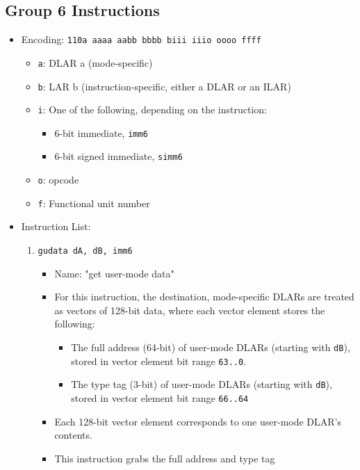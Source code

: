 \documentclass{article}
\begin{document}
	\subsection{Group 6 Instructions}
		\begin{itemize}
		\item Encoding:  \texttt{110a aaaa aabb bbbb  biii iiio oooo ffff}
			\begin{itemize}
			\item \texttt{a}:  DLAR a (mode-specific)
			\item \texttt{b}:  LAR b (instruction-specific, either a DLAR
				or an ILAR)
			\item \texttt{i}:
				One of the following, depending on the instruction:
				\begin{itemize}
				\item 6-bit immediate, \texttt{imm6}
				\item 6-bit signed immediate, \texttt{simm6}
				\end{itemize}
			\item \texttt{o}:  opcode
			\item \texttt{f}:  Functional unit number
			\end{itemize}
		\item Instruction List:
			\begin{enumerate}
			\item \texttt{gudata dA, dB, imm6}
				\begin{itemize}
				\item Name:  "get user-mode data"
				\item For this instruction, the destination, mode-specific
					DLARs are treated as vectors of 128-bit data, where
					each vector element stores the following:
					\begin{itemize}
					\item The full address (64-bit) of user-mode DLARs
						(starting with \texttt{dB}), stored in vector
						element bit range \texttt{63..0}.
					\item The type tag (3-bit) of user-mode DLARs (starting
						with \texttt{dB}), stored in vector element bit
						range \texttt{66..64}
					\end{itemize}
				\item Each 128-bit vector element corresponds to one
					user-mode DLAR's contents.
				\item This instruction grabs the full address and type tag

\end{itemize}
\end{enumerate}
\end{itemize}
\end{document}
